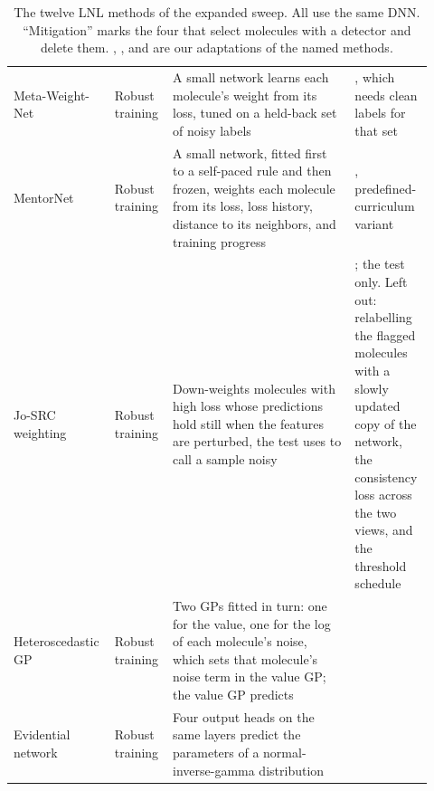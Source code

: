 \begin{table}[htbp]
\begin{adjustbox}{max width=\textwidth,max totalheight=0.85\textheight}
\begin{tabular}{@{}P{0.20\linewidth}P{0.12\linewidth}P{0.42\linewidth}P{0.18\linewidth}@{}}
Meta-Weight-Net & Robust training & A small network learns each molecule's weight from its loss, tuned on a held-back set of noisy labels & \citet{shu2019metaweightnet}, which needs clean labels for that set \\
MentorNet & Robust training & A small network, fitted first to a self-paced rule and then frozen, weights each molecule from its loss, loss history, distance to its neighbors, and training progress & \citet{jiang2018mentornet}, predefined-curriculum variant \\
Jo-SRC weighting & Robust training & Down-weights molecules with high loss whose predictions hold still when the features are perturbed, the test \citet{yao2021josrc} uses to call a sample noisy & \citet{yao2021josrc}; the test only. Left out: relabelling the flagged molecules with a slowly updated copy of the network, the consistency loss across the two views, and the threshold schedule \\
Heteroscedastic GP & Robust training & Two GPs fitted in turn: one for the value, one for the log of each molecule's noise, which sets that molecule's noise term in the value GP; the value GP predicts & \citet{kersting2007most} \\
Evidential network & Robust training & Four output heads on the same layers predict the parameters of a normal-inverse-gamma distribution & \citet{amini2020deep} \\
\bottomrule
\end{tabular}
\end{adjustbox}
\caption[The expanded LNL sweep.]{The twelve LNL methods of the expanded sweep. All use the same DNN. ``Mitigation'' marks the four that select molecules with a detector and delete them. , , and  are our adaptations of the named methods.}
\label{tab:noise:robust}
\end{table}

